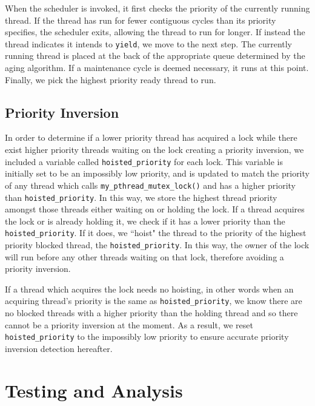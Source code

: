 \documentclass{article}
\begin{document}
When the scheduler is invoked, it first checks the priority of the currently running thread.
If the thread has run for fewer contiguous cycles than its priority specifies, the scheduler exits, allowing the thread to run for longer.
If instead the thread indicates it intends to \verb|yield|, we move to the next step.
The currently running thread is placed at the back of the appropriate queue determined by the aging algorithm.
If a maintenance cycle is deemed necessary, it runs at this point.
Finally, we pick the highest priority ready thread to run.

\subsection{Priority Inversion}
In order to determine if a lower priority thread has acquired a lock while there exist higher priority threads waiting on the lock creating a priority inversion, we included a variable called \verb|hoisted_priority| for each lock. This variable is initially set to be an impossibly low priority, and is updated to match the priority of any thread which calls \verb|my_pthread_mutex_lock()| and has a higher priority than \verb|hoisted_priority|. In this way, we store the highest thread priority amongst those threads either waiting on or holding the lock. If a thread acquires the lock or is already holding it, we check if it has a lower priority than the \verb|hoisted_priority|. If it does, we ``hoist" the thread to the priority of the highest priority blocked thread, the \verb|hoisted_priority|. In this way, the owner of the lock will run before any other threads waiting on that lock, therefore avoiding a priority inversion. 

If a thread which acquires the lock needs no hoisting, in other words when an acquiring thread's priority is the same as \verb|hoisted_priority|, we know there are no blocked threads with a higher priority than the holding thread and so there cannot be a priority inversion at the moment. As a result, we reset \verb|hoisted_priority| to the impossibly low priority to ensure accurate priority inversion detection hereafter. 

\section{Testing and Analysis}
\end{document}
